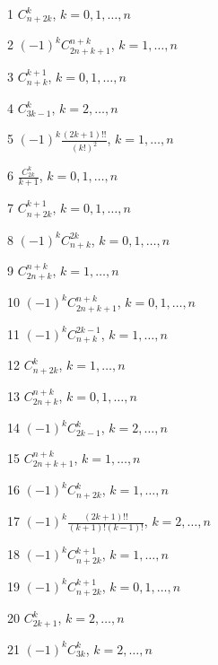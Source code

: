 \documentclass[11pt, russian]{article}
\begin{document}
1 
$C_{n+2k}^{k}$, $k=0,1,\ldots,n$\par

2 
$(-1)^{k}C_{2n+k+1}^{n+k}$, $k=1,\ldots,n$\par

3 
$C_{n+k}^{k+1}$, $k=0,1,\ldots,n$\par

4 
$C_{3k-1}^{k}$, $k=2,\ldots,n$\par

5 
$(-1)^{k}\frac{(2k+1)!!}{(k!)^2}$, $k=1,\ldots,n$\par

6 
$\frac{C_{2k}^k}{k+1}$, $k=0,1,\ldots,n$\par

7 
$C_{n+2k}^{k+1}$, $k=0,1,\ldots,n$\par

8 
$(-1)^{k}C_{n+k}^{2k}$, $k=0,1,\ldots,n$\par

9 
$C_{2n+k}^{n+k}$, $k=1,\ldots,n$\par

10 
$(-1)^{k}C_{2n+k+1}^{n+k}$, $k=0,1,\ldots,n$\par

11 
$(-1)^{k}C_{n+k}^{2k-1}$, $k=1,\ldots,n$\par

12 
$C_{n+2k}^{k}$, $k=1,\ldots,n$\par

13 
$C_{2n+k}^{n+k}$, $k=0,1,\ldots,n$\par

14 
$(-1)^{k}C_{2k-1}^{k}$, $k=2,\ldots,n$\par

15 
$C_{2n+k+1}^{n+k}$, $k=1,\ldots,n$\par

16 
$(-1)^{k}C_{n+2k}^{k}$, $k=1,\ldots,n$\par

17 
$(-1)^{k}\frac{(2k+1)!!}{(k+1)!(k-1)!}$, $k=2,\ldots,n$\par

18 
$(-1)^{k}C_{n+2k}^{k+1}$, $k=1,\ldots,n$\par

19 
$(-1)^{k}C_{n+2k}^{k+1}$, $k=0,1,\ldots,n$\par

20 
$C_{2k+1}^{k}$, $k=2,\ldots,n$\par

21 
$(-1)^{k}C_{3k}^{k}$, $k=2,\ldots,n$\par
\end{document}
